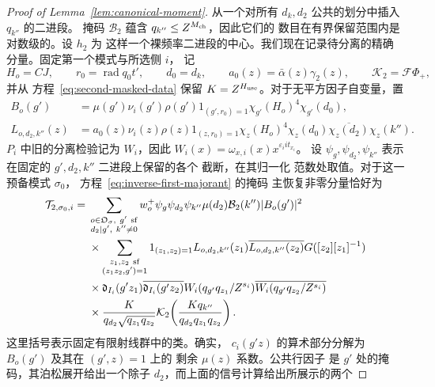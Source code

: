 \documentclass[11pt,a4paper]{article}
\numberwithin{equation}{section}
\numberwithin{figure}{section}
\theoremstyle{definition}
\theoremstyle{remark}
\begin{document}
\begin{proof}[Proof of Lemma~\ref{lem:canonical-moment}]
从一个对所有 \(d_k,d_2\) 公共的划分中插入 \(q_{k''}\) 的二进段。
掩码 \(\mathcal B_2\) 蕴含 \(q_{k''}\le Z^{M_{\rm ch}}\)，因此它们的
数目在有界保留范围内是对数级的。设 \(h_2\) 为
这样一个裸频率二进段的中心。我们现在记录待分离的精确
分量。固定第一个模式与所选侧 \(i\)，
记
\[
 H_o=CJ,\qquad r_0=\operatorname{rad}q_0t',\qquad d_0=d_k,
 \qquad a_0(z)=\bar\alpha(z)\gamma_2(z),\qquad
 \mathcal K_2=\mathcal F\Phi_+,
\]
并从
方程~\eqref{eq:second-masked-data} 保留 \(K=Z^{H_{\rm use}}\)。对于无平方因子自变量，置
\begin{equation}\label{eq:inverse-second-outer-coefficients}
 \begin{split}
 B_o(g')&=\mu(g')\nu_i(g')\rho(g')1_{(g',r_0)=1}
              \chi_{g'}(H_o)^4\chi_{g'}(d_0),\\
 L_{o,d_2,k''}(z)&=a_0(z)\nu_i(z)\rho(z)1_{(z,r_0)=1}
       \chi_z(H_o)^4\chi_z(d_0)\overline{\chi_z(d_2)}\chi_z(k'').
 \end{split}
\end{equation}
\(P_i\) 中旧的分离检验记为 \(W_i\)，因此
\(W_i(x)=\omega_{x,i}(x)x^{\varepsilon_iit_{x_i}}\)。
设 \(\psi_g,\psi_{d_2},\psi_{k''}\) 表示在固定的 \(g',d_2,k''\) 二进段上保留的各个
截断，在其归一化
范数处取值。对于这一预备模式 \(\sigma_0\)，
方程~\eqref{eq:inverse-first-majorant} 的掩码
主恢复非零分量恰好为
\begin{equation}\label{eq:inverse-second-formal-component}
 \begin{split}
 \mathcal T_{2,\sigma_0,i}={}&
 \sum_{\substack{o\in\mathfrak O_\sigma,\ g'\ {\rm sf}\\d_2\mid g',\ k''\ne0}}
 w_o^+\psi_g\psi_{d_2}\psi_{k''}\mu(d_2)\mathcal B_2(k'')|B_o(g')|^2\\
 &\times\sum_{\substack{z_1,z_2\ {\rm sf}\\(z_1z_2,g')=1}}
 1_{(z_1,z_2)=1}L_{o,d_2,k''}(z_1)\overline{L_{o,d_2,k''}(z_2)}
       G([z_2][z_1]^{-1})\\
 &\times\mathfrak d_{I_i}(g'z_1)\overline{\mathfrak d_{I_i}(g'z_2)}
       W_i(q_{g'}q_{z_1}/Z^{s_i})
       \overline{W_i(q_{g'}q_{z_2}/Z^{s_i})}\\
 &\times\frac{K}{q_{d_2}\sqrt{q_{z_1}q_{z_2}}}
       \mathcal K_2\!\left(\frac{Kq_{k''}}{q_{d_2}q_{z_1}q_{z_2}}\right).
 \end{split}
\end{equation}
这里括号表示固定有限射线群中的类。确实，
\(c_i(g'z)\) 的算术部分分解为 \(B_o(g')\) 及其在 \((g',z)=1\) 上的
剩余 \(\mu(z)\) 系数。公共行因子
是 \(g'\) 处的掩码，其泊松展开给出一个除子
\(d_2\)，而上面的信号计算给出所展示的两个

\end{proof}
\end{document}
